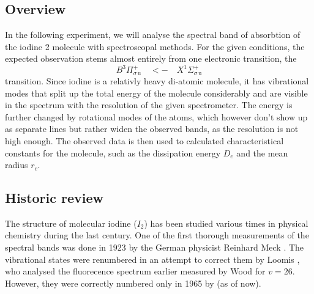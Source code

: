 \subsection{Overview}
In the following experiment, we will analyse the spectral band of absorbtion of the iodine 2 molecule 
with spectroscopal methods. For the given conditions, the expected observation stems almost 
entirely from one electronic transition, the 
\begin{equation}
    B ^3\Pi_{\sigma \, \mathrm{u}}^{+} \quad <- \quad X ^1\Sigma_{\sigma \, \mathrm{u}}^{+}
\end{equation}
transition. Since iodine is a relativly heavy di-atomic molecule, it has vibrational modes that 
split up the total energy of the molecule considerably and are visible in the spectrum with the 
resolution of the given spectrometer. The energy is further changed by rotational modes of the 
atoms, which however don't show up as separate lines but rather widen the observed bands, as the 
resolution is not high enough. 
The observed data is then used to calculated characteristical constants for the molecule, such as 
the dissipation energy $D_e$ and the mean radius $r_c$. 

\subsection{Historic review}
The structure of molecular iodine ($I_2$) has been studied various times in physical chemistry 
during the last century. One of the first thorough measurements of the spectral bands was done in 
1923 by the German physicist Reinhard Meck \cite{mecke1923bandenspektrum}. The vibrational states 
were renumbered in an attempt to correct them by Loomis \cite{loomis1927correlation}, who analysed 
the fluorecence spectrum earlier measured by Wood \cite{wood1911} for $v = 26$. However, they were 
correctly numbered only in 1965 by \cite{steinfeld1965spectroscopic} (as of now). 


